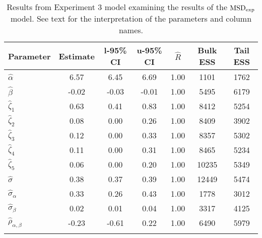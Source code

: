 \begin{table}

\caption{Results from Experiment 3 model examining the results of the $\operatorname{MSD}_{\text{exp}}$ model. \label{tab:Experiment 3-MSD}See text for the interpretation of the parameters and column names.}

\begin{tabular}{l *3{S[table-format=-1.2]} S[table-format=1.2] *2{S[table-format=5.0]}}
\lsptoprule
Parameter & {Estimate} & {l-95\% CI} & {u-95\% CI} & {$\hat{R}$} & {Bulk ESS} & {Tail ESS}\\
\midrule
$\hat\alpha$ & 6.57 & 6.45 & 6.69 & 1.00 & 1101 & 1762\\
$\hat\beta$ & -0.02 & -0.03 & -0.01 & 1.00 & 5495 & 6179\\
$\hat\zeta_{1}$ & 0.63 & 0.41 & 0.83 & 1.00 & 8412 & 5254\\
$\hat\zeta_{2}$ & 0.08 & 0.00 & 0.26 & 1.00 & 8409 & 3902\\
$\hat\zeta_{3}$ & 0.12 & 0.00 & 0.33 & 1.00 & 8357 & 5302\\
$\hat\zeta_{4}$ & 0.11 & 0.00 & 0.31 & 1.00 & 8465 & 5234\\
$\hat\zeta_{5}$ & 0.06 & 0.00 & 0.20 & 1.00 & 10235 & 5349\\
$\hat\sigma$ & 0.38 & 0.37 & 0.39 & 1.00 & 12449 & 5474\\
$\hat\sigma_{\alpha}$ & 0.33 & 0.26 & 0.43 & 1.00 & 1778 & 3012\\
$\hat\sigma_{\beta}$ & 0.02 & 0.01 & 0.04 & 1.00 & 3317 & 4125\\
$\hat\rho_{\alpha,\beta}$ & -0.23 & -0.61 & 0.22 & 1.00 & 6490 & 5979\\
\lspbottomrule
\end{tabular}

\end{table}






